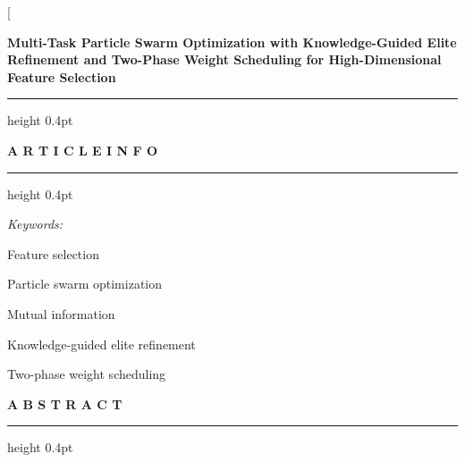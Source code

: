 \documentclass[final,5p,times,fleqn]{elsarticle}
\begin{document}
\twocolumn[{%
  \vspace*{0.2cm}
  {\fontsize{16}{20}\selectfont\bfseries Multi-Task Particle Swarm Optimization with Knowledge-Guided Elite Refinement and Two-Phase Weight Scheduling for High-Dimensional Feature Selection\par}
  \vspace{12pt}

  \hrule height 0.4pt
  \vspace{6pt}

  \noindent
  \begin{minipage}[t]{0.28\textwidth}
    \vspace{0pt}
    {\fontsize{8.5}{10}\selectfont\bfseries A R T I C L E \quad I N F O}\par
    \vspace{2pt}
    \hrule height 0.4pt
    \vspace{5pt}
    {\fontsize{7.5}{9.2}\selectfont
    \textit{Keywords:}\par
    Feature selection\par
    Particle swarm optimization\par
    Mutual information\par
    Knowledge-guided elite refinement\par
    Two-phase weight scheduling\par
    }
  \end{minipage}%
  \hfill
  \begin{minipage}[t]{0.68\textwidth}
    \vspace{0pt}
    {\fontsize{8.5}{10}\selectfont\bfseries A B S T R A C T}\par
    \vspace{2pt}
    \hrule height 0.4pt
    \vspace{5pt}
    {\fontsize{7.5}{9.2}\selectfont
}
\end{minipage}}
\end{document}
